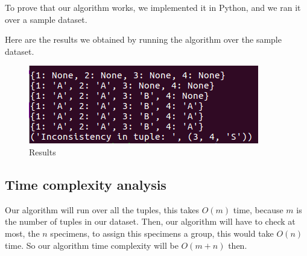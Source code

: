 \documentclass{article}
\begin{document}
To prove that our algorithm works, we implemented it in Python, and we ran it over a sample dataset.



Here are the results we obtained by running the algorithm over the sample dataset.

\begin{figure}[H]
\begin{center}
\includegraphics[scale=.8]{problem2}
\end{center}
\caption{Results}
\end{figure}

\subsection*{Time complexity analysis}

Our algorithm will run over all the tuples, this takes $O(m)$ time, because $m$ is the number of tuples in our dataset. Then, our algorithm will have to check at most, the $n$ specimens, to assign this specimens a group, this would take $O(n)$ time. So our algorithm time complexity will be $O(m+n)$ then.
\end{document}
